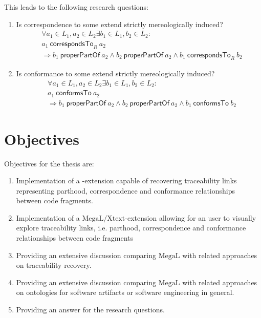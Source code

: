\documentclass[runningheads,a4paper]{llncs}
\newcommand{\properPartOf}{~\textsf{properPartOf}~}
\newcommand{\correspondsToR}[1]{~\textsf{correspondsTo}_{#1}~}
\newcommand{\conformsTo}{~\textsf{conformsTo}~}
\newcommand{\megal}{\text{MegaL}}
\newcommand{\megalxtext}{\text{MegaL/Xtext}}
\begin{document}
This leads to the following research questions:
\begin{enumerate}[RQ1]

\item
Is correspondence to some extend strictly mereologically induced?
\begin{align*}
&\forall a_1 \in L_1, a_2 \in L_2 \exists b_1 \in L_1, b_2 \in L_2 :
\\&a_1 \correspondsToR{R} a_2
\\&\Rightarrow 
b_1 \properPartOf a_2 
\wedge b_2 \properPartOf a_2 
\wedge b_1 \correspondsToR{R} b_2
\end{align*}

\item
Is conformance to some extend strictly mereologically induced?
\begin{align*}
&\forall a_1 \in L_1, a_2 \in L_2 \exists b_1 \in L_1, b_2 \in L_2 :
\\&a_1 \conformsTo a_2
\\&\Rightarrow 
b_1 \properPartOf a_2 
\wedge b_2 \properPartOf a_2 
\wedge b_1 \conformsTo b_2
\end{align*}

\end{enumerate}

\section{Objectives}
\label{section:Objectives}
Objectives for the thesis are:
\begin{enumerate}[O1]
\item
Implementation of a \megalxtext-extension capable of recovering traceability links representing parthood, correspondence and conformance relationships between code fragments.

\item
Implementation of a $\megalxtext$-extension allowing for an user to visually explore traceability links, i.e. parthood, correspondence and conformance relationships between code fragments

\item
Providing an extensive discussion comparing $\megal$ with related approaches on traceability recovery.

\item
Providing an extensive discussion comparing $\megal$ with related approaches on ontologies for software artifacts or software engineering in general.

\item
Providing an answer for the research questions.

\end{enumerate}
\end{document}
